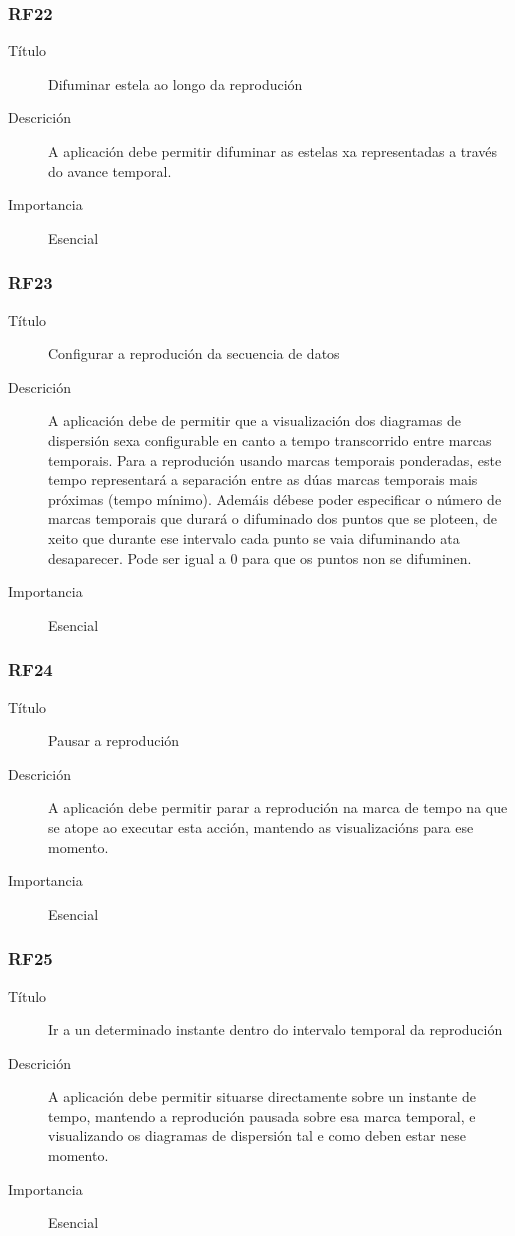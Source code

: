 \subsubsection*{RF22}
\begin{description}
\item[Título] \hfill
Difuminar estela ao longo da reprodución
\item[Descrición] \hfill
A aplicación debe permitir difuminar as estelas xa representadas a través do avance temporal.
\item[Importancia] \hfill
Esencial
\end{description}

\subsubsection*{RF23}
\begin{description}
\item[Título] \hfill
Configurar a reprodución da secuencia de datos
\item[Descrición] \hfill
A aplicación debe de permitir que a visualización dos diagramas de dispersión sexa configurable en canto a tempo transcorrido entre marcas temporais. Para a reprodución usando marcas temporais ponderadas, este tempo representará a separación entre as dúas marcas temporais mais próximas (tempo mínimo). Ademáis débese poder especificar o número de marcas temporais que durará o difuminado dos puntos que se ploteen, de xeito que durante ese intervalo cada punto se vaia difuminando ata desaparecer. Pode ser igual a 0 para que os puntos non se difuminen.
\item[Importancia] \hfill
Esencial
\end{description}

\subsubsection*{RF24}
\begin{description}
\item[Título] \hfill
Pausar a reprodución
\item[Descrición] \hfill
A aplicación debe permitir parar a reprodución na marca de tempo na que se atope ao executar esta acción, mantendo as visualizacións para ese momento.
\item[Importancia] \hfill
Esencial
\end{description}

\subsubsection*{RF25}
\begin{description}
\item[Título] \hfill
Ir a un determinado instante dentro do intervalo temporal da reprodución
\item[Descrición] \hfill
A aplicación debe permitir situarse directamente sobre un instante de tempo, mantendo a reprodución pausada sobre esa marca temporal, e visualizando os diagramas de dispersión tal e como deben estar nese momento.
\item[Importancia] \hfill
Esencial
\end{description}

